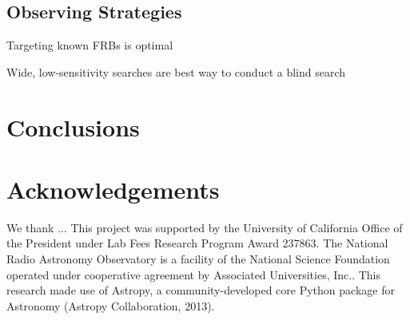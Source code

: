 \documentclass{emulateapj}
\begin{document}
\subsection{Observing Strategies}

Targeting known FRBs is optimal

Wide, low-sensitivity searches are best way to conduct a blind search

\cite{2016MNRAS.458L..89C}


\section{Conclusions}





\section*{Acknowledgements}
We thank ...
This project was supported by the University of California Office of the President under Lab Fees Research Program Award 237863. The National Radio Astronomy Observatory is a facility of the National Science Foundation operated under cooperative agreement by Associated Universities, Inc.. This research made use of Astropy, a community-developed core Python package for Astronomy (Astropy Collaboration, 2013).




\end{document}
